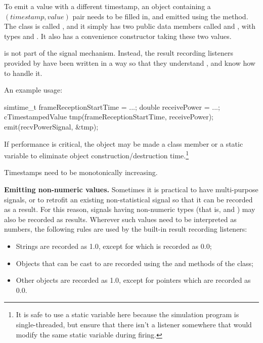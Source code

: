 To emit a value with a different timestamp, an object containing
a $(timestamp, value)$ pair needs to be filled in, and emitted using
the  method. The class is called
, and it simply has two public data members called
 and , with types  and .
It also has a convenience constructor taking these two values.

\begin{note}
 is not part of the signal mechanism. Instead,
the result recording listeners provided by {\opp} have been written
in a way so that they understand , and know how
to handle it.
\end{note}

An example usage:

\begin{cpp}
simtime_t frameReceptionStartTime = ...;
double receivePower = ...;
cTimestampedValue tmp(frameReceptionStartTime, receivePower);
emit(recvPowerSignal, &tmp);
\end{cpp}

If performance is critical, the  object may be
made a class member or a static variable to eliminate object
construction/destruction time.\footnote{It is safe to use a static
variable here because the simulation program is single-threaded,
but ensure that there isn't a listener somewhere that would modify
the same static variable during firing.}

Timestamps need to be monotonically increasing.

\textbf{Emitting non-numeric values.} Sometimes it is practical to have
multi-purpose signals, or to retrofit an existing non-statistical signal so
that it can be recorded as a result. For this reason, signals having
non-numeric types (that is,  and ) may
also be recorded as results. Wherever such values need to be interpreted as
numbers, the following rules are used by the built-in result recording
listeners:

\begin{itemize}
  \item Strings are recorded as 1.0, except for  which is recorded as 0.0;
  \item Objects that can be cast to  are recorded
     using the  and 
     methods of the class;
  \item Other objects are recorded as 1.0, except for  pointers which
     are recorded as 0.0.
\end{itemize}

